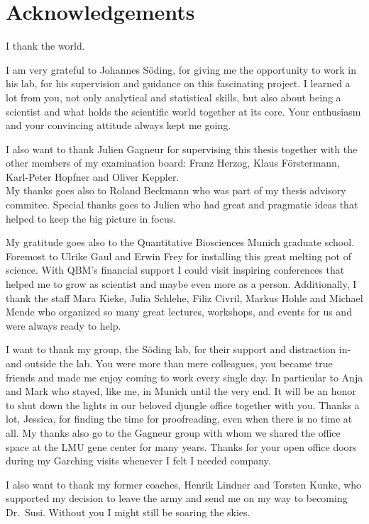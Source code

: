 \documentclass[11pt,a4paper,twoside]{book}
\theoremstyle{definition}
\theoremstyle{definition}
\theoremstyle{remark}
\begin{document}
\chapter*{Acknowledgements}\label{acknowledgements}

I thank the world.

I am very grateful to Johannes Söding, for giving me the opportunity to
work in his lab, for his supervision and guidance on this fascinating
project. I learned a lot from you, not only analytical and statistical
skills, but also about being a scientist and what holds the scientific
world together at its core. Your enthusiasm and your convincing attitude
always kept me going.

I also want to thank Julien Gagneur for supervising this thesis together
with the other members of my examination board: Franz Herzog, Klaus
Förstermann, Karl-Peter Hopfner and Oliver Keppler.\\
My thanks goes also to Roland Beckmann who was part of my thesis
advisory commitee. Special thanks goes to Julien who had great and
pragmatic ideas that helped to keep the big picture in focus.

My gratitude goes also to the Quantitative Biosciences Munich graduate
school. Foremost to Ulrike Gaul and Erwin Frey for installing this great
melting pot of science. With QBM's financial support I could visit
inspiring conferences that helped me to grow as scientist and maybe even
more as a person. Additionally, I thank the staff Mara Kieke, Julia
Schlehe, Filiz Civril, Markus Hohle and Michael Mende who organized so
many great lectures, workshops, and events for us and were always ready
to help.

I want to thank my group, the Söding lab, for their support and
distraction in- and outside the lab. You were more than mere colleagues,
you became true friends and made me enjoy coming to work every single
day. In particular to Anja and Mark who stayed, like me, in Munich until
the very end. It will be an honor to shut down the lights in our beloved
djungle office together with you. Thanks a lot, Jessica, for finding the
time for proofreading, even when there is no time at all. My thanks also
go to the Gagneur group with whom we shared the office space at the LMU
gene center for many years. Thanks for your open office doors during my
Garching visits whenever I felt I needed company.

I also want to thank my former coaches, Henrik Lindner and Torsten
Kunke, who supported my decision to leave the army and send me on my way
to becoming Dr.~Susi. Without you I might still be soaring the skies.
\end{document}
